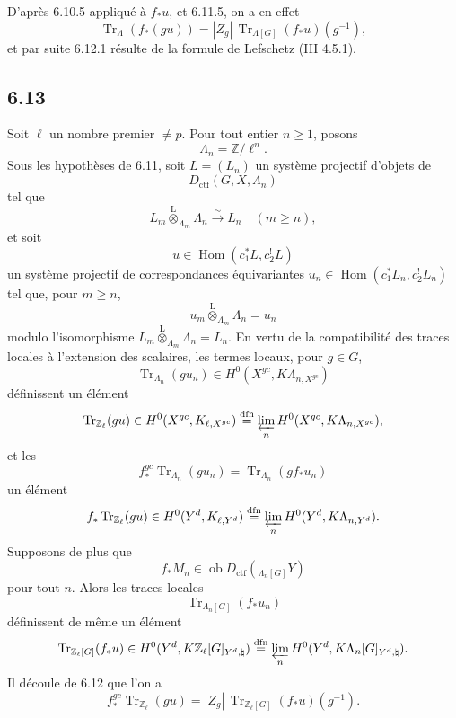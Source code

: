 \documentclass[11pt]{article}
\DeclareMathOperator{\Hom}{Hom}
\providecommand{\Tr}{\operatorname{Tr}}
\providecommand{\Tr}{\operatorname{Tr}}
\providecommand{\lten}{\overset{\mathrm L}{\otimes}}
\providecommand{\Ob}{\operatorname{ob}}
\providecommand{\Tr}{\operatorname{Tr}}
\providecommand{\Hom}{\operatorname{Hom}}
\providecommand{\lten}{\overset{\mathrm L}{\otimes}}
\providecommand{\lten}{\overset{\mathrm L}{\otimes}}
\providecommand{\Ob}{\operatorname{ob}}
\providecommand{\Tr}{\operatorname{Tr}}
\providecommand{\lten}{\overset{\mathrm L}{\otimes}}
\providecommand{\lten}{\overset{\mathrm L}{\otimes}}
\providecommand{\Ob}{\operatorname{Ob}}
\providecommand{\lten}{\overset{\mathrm L}{\otimes}}
\begin{document}
D'après 6.10.5 appliqué à $f_*u$, et 6.11.5, on a en effet
\[
\Tr_{\Lambda}(f_*(gu))=|Z_g|\,\Tr_{\Lambda[G]}(f_*u)(g^{-1}),
\]
et par suite 6.12.1 résulte de la formule de Lefschetz (III 4.5.1).

\subsection*{6.13}
Soit $\ell$ un nombre premier $\ne p$. Pour tout entier $n\ge1$, posons
\[
\Lambda_n=\mathbb Z/\ell^n.
\]
Sous les hypothèses de 6.11, soit $L=(L_n)$ un système projectif d'objets de
\[
D_{\mathrm{ctf}}(G,X,\Lambda_n)
\]
tel que
\[
L_m\lten_{\Lambda_m}\Lambda_n\xrightarrow{\sim}L_n\quad (m\ge n),
\]
et soit
\[
u\in\Hom(c_1^*L,c_2^!L)
\]
un système projectif de correspondances équivariantes $u_n\in\Hom(c_1^*L_n,c_2^!L_n)$ tel que, pour $m\ge n$,
\[
u_m\lten_{\Lambda_m}\Lambda_n=u_n
\]
modulo l'isomorphisme $L_m\lten_{\Lambda_m}\Lambda_n=L_n$. En vertu de la compatibilité des traces locales à l'extension des scalaires, les termes locaux, pour $g\in G$,
\[
\Tr_{\Lambda_n}(gu_n)\in H^0(X^{gc},K\Lambda_{n,X^{gc}})
\]
définissent un élément
\[
\Tr_{\mathbb Z_{\ell}}(gu)\in
H^0(X^{gc},K_{\ell,X^{gc}})
\stackrel{\mathrm{dfn}}{=}
\varprojlim_n H^0(X^{gc},K\Lambda_{n,X^{gc}}),
\]
et les
\[
f_*^{gc}\Tr_{\Lambda_n}(gu_n)=\Tr_{\Lambda_n}(gf_*u_n)
\]
un élément
\[
f_*\Tr_{\mathbb Z_{\ell}}(gu)\in
H^0(Y^d,K_{\ell,Y^d})
\stackrel{\mathrm{dfn}}{=}
\varprojlim_n H^0(Y^d,K\Lambda_{n,Y^d}).
\]
Supposons de plus que
\[
f_*M_n\in\Ob D_{\mathrm{ctf}}({}_{\Lambda_n[G]}Y)
\]
pour tout $n$. Alors les traces locales
\[
\Tr_{\Lambda_n[G]}(f_*u_n)
\]
définissent de même un élément
\[
\Tr_{\mathbb Z_{\ell}[G]}(f_*u)\in
H^0(Y^d,K\mathbb Z_{\ell}[G]_{Y^d,\natural})
\stackrel{\mathrm{dfn}}{=}
\varprojlim_n H^0(Y^d,K\Lambda_n[G]_{Y^d,\natural}).
\]
Il découle de 6.12 que l'on a
\begin{equation}
f_*^{gc}\Tr_{\mathbb Z_{\ell}}(gu)
=
|Z_g|\,\Tr_{\mathbb Z_{\ell}[G]}(f_*u)(g^{-1}).
\tag{6.13.1}
\end{equation}
\end{document}
